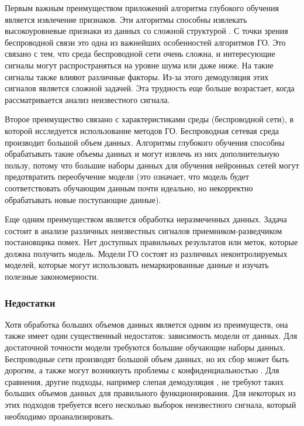 Первым важным преимуществом приложений алгоритма глубокого обучения является извлечение признаков. Эти алгоритмы способны извлекать высокоуровневые признаки из данных со сложной структурой \cite{bigdataanal}. С точки зрения беспроводной связи это одна из важнейших особенностей алгоритмов ГО. Это связано с тем, что среда беспроводной сети очень сложна, и интересующие сигналы могут распространяться на уровне шума или даже ниже. На такие сигналы также влияют различные факторы. Из-за этого демодуляция этих сигналов является сложной задачей. Эта трудность еще больше возрастает, когда рассматривается анализ неизвестного сигнала.

Второе преимущество связано с характеристиками среды (беспроводной сети), в которой исследуется использование методов ГО. Беспроводная сетевая среда производит большой объем данных. Алгоритмы глубокого обучения способны обрабатывать такие объемы данных и могут извлечь из них дополнительную пользу, потому что большие наборы данных для обучения нейронных сетей могут предотвратить переобучение модели \cite{overfittingmeasument} (это означает, что модель будет соответствовать обучающим данным почти идеально, но некорректно обрабатывать новые поступающие данные).

Еще одним преимуществом является обработка неразмеченных данных. Задача состоит в анализе различных неизвестных сигналов приемником-разведчиком постановщика помех. Нет доступных правильных результатов или меток, которые должна получить модель. Модели ГО состоят из различных неконтролируемых моделей, которые могут использовать немаркированные данные и изучать полезные закономерности.

\subsubsection{Недостатки}

Хотя обработка больших объемов данных является одним из преимуществ, она также имеет один существенный недостаток: зависимость модели от данных. Для достаточной точности модели требуются большие обучающие наборы данных. Беспроводные сети производят большой объем данных, но их сбор может быть дорогим, а также могут возникнуть проблемы с конфиденциальностью \cite{deeplearninmob}. Для сравнения, другие подходы, например слепая демодуляция \cite{blinddespreading}, не требуют таких больших объемов данных для правильного функционирования. Для некоторых из этих подходов требуется всего несколько выборок неизвестного сигнала, который необходимо проанализировать.

